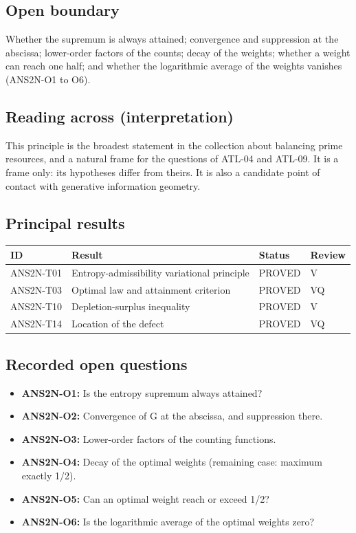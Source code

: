 \documentclass[
  11pt,
]{article}
\providecommand{\tightlist}{%
  \setlength{\itemsep}{0pt}\setlength{\parskip}{0pt}}
\begin{document}
\hypertarget{open-boundary-10}{%
\subsection{Open boundary}\label{open-boundary-10}}

Whether the supremum is always attained; convergence and suppression at
the abscissa; lower-order factors of the counts; decay of the weights;
whether a weight can reach one half; and whether the logarithmic average
of the weights vanishes (ANS2N-O1 to O6).

\hypertarget{reading-across-interpretation-10}{%
\subsection{Reading across
(interpretation)}\label{reading-across-interpretation-10}}

This principle is the broadest statement in the collection about
balancing prime resources, and a natural frame for the questions of
ATL-04 and ATL-09. It is a frame only: its hypotheses differ from
theirs. It is also a candidate point of contact with generative
information geometry.

\hypertarget{principal-results-10}{%
\subsection{Principal results}\label{principal-results-10}}

\begin{longtable}[]{@{}llll@{}}
\toprule
ID & Result & Status & Review\tabularnewline
\midrule
\endhead
ANS2N-T01 & Entropy-admissibility variational principle & PROVED &
V\tabularnewline
ANS2N-T03 & Optimal law and attainment criterion & PROVED &
VQ\tabularnewline
ANS2N-T10 & Depletion-surplus inequality & PROVED & V\tabularnewline
ANS2N-T14 & Location of the defect & PROVED & VQ\tabularnewline
\bottomrule
\end{longtable}

\hypertarget{recorded-open-questions-9}{%
\subsection{Recorded open questions}\label{recorded-open-questions-9}}

\begin{itemize}
\tightlist
\item
  \textbf{ANS2N-O1:} Is the entropy supremum always attained?
\item
  \textbf{ANS2N-O2:} Convergence of G at the abscissa, and suppression
  there.
\item
  \textbf{ANS2N-O3:} Lower-order factors of the counting functions.
\item
  \textbf{ANS2N-O4:} Decay of the optimal weights (remaining case:
  maximum exactly 1/2).
\item
  \textbf{ANS2N-O5:} Can an optimal weight reach or exceed 1/2?
\item
  \textbf{ANS2N-O6:} Is the logarithmic average of the optimal weights
  zero?
\end{itemize}
\end{document}
